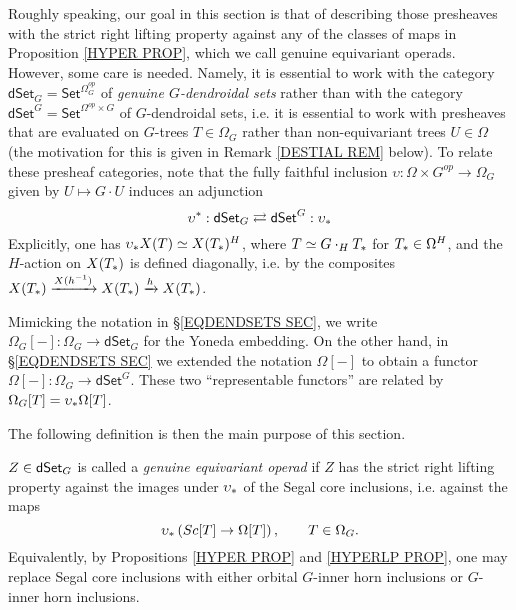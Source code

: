 \documentclass[a4paper,10pt
,draft
]{article}%
\begin{document}
Roughly speaking, our goal in this section is that of describing those presheaves with the 
strict right lifting property against any of the classes of maps in Proposition \ref{HYPER PROP},
which we call genuine equivariant operads.
However, some care is needed.
Namely, it is essential to work with the category
$\mathsf{dSet}_G = \mathsf{Set}^{\Omega_G^{op}}$
of \textit{genuine $G$-dendroidal sets}
rather than with the category
$\mathsf{dSet}^G = \mathsf{Set}^{\Omega^{op} \times G}$
of $G$-dendroidal sets, i.e. it is essential to work with presheaves that are evaluated on 
$G$-trees $T \in \Omega_G$
rather than non-equivariant trees $U \in \Omega$
(the motivation for this is given in 
Remark \ref{DESTIAL REM} below).
To relate these presheaf categories, note that the fully faithful inclusion
$\upsilon \colon \Omega \times G^{op} \to \Omega_G$
given by $U \mapsto G \cdot U$ induces an adjunction
\begin{equation}\label{DSETG_EQ}
	\upsilon^{\**}: \dSet_G \rightleftarrows \dSet^G : \upsilon_{\**}
\end{equation}
Explicitly, one has 
$\upsilon_{\**}X(T) \simeq X(T_{\**})^H$,
where $T \simeq G \cdot_H T_{\**}$ for 
$T_{\**} \in \Omega^H$,
and the $H$-action on 
$X(T_{\**})$ is defined diagonally, i.e. by the composites
$X(T_{\**}) \xrightarrow{X(h^{-1})}
X(T_{\**}) \xrightarrow{h} X(T_{\**})$.


\begin{remark}
Mimicking the notation in \S \ref{EQDENDSETS SEC},
we write $\Omega_G[-] \colon \Omega_G \to \mathsf{dSet}_G$
for the Yoneda embedding.
On the other hand, in 
\S \ref{EQDENDSETS SEC} we extended the notation $\Omega[-]$
to obtain a functor $\Omega[-] \colon \Omega_G \to \mathsf{dSet}^G$.
These two ``representable functors'' are related by 
$\Omega_G[T] = \upsilon_{\**} \Omega[T]$.
\end{remark}

The following definition is then the main purpose of this section.


\begin{definition}\label{GEN_OP_DEF}
	$Z \in \mathsf{dSet}_G$ is called a \textit{genuine equivariant operad} if
	$Z$ has the strict right lifting property against the images under $\upsilon_{\**}$
	of the Segal core inclusions, i.e. against the maps
	\begin{equation}\label{GGIOP_EQ}
		\upsilon_{\**}\left(Sc[T] \to \Omega[T] \right),
		\qquad
		T \in \Omega_G.
	\end{equation}
Equivalently, by Propositions \ref{HYPER PROP} and \ref{HYPERLP PROP}, one may replace Segal core inclusions with either orbital $G$-inner horn inclusions or $G$-inner horn inclusions.
\end{definition}
\end{document}
